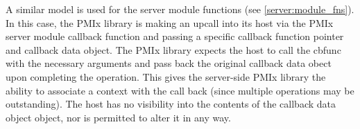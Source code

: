 A similar model is used for the server module functions (see \ref{server:module_fns}). In this case, the \ac{PMIx} library is making an upcall into its host via the \ac{PMIx} server module callback function and passing a specific callback function pointer and callback data object. The \ac{PMIx} library expects the host to call the cbfunc with the necessary arguments and pass back the original callback data obect upon completing the operation. This gives the server-side \ac{PMIx} library the ability to associate a context with the call back (since multiple operations may be outstanding). The host has no visibility into the contents of the callback data object object, nor is permitted to alter it in any way.
